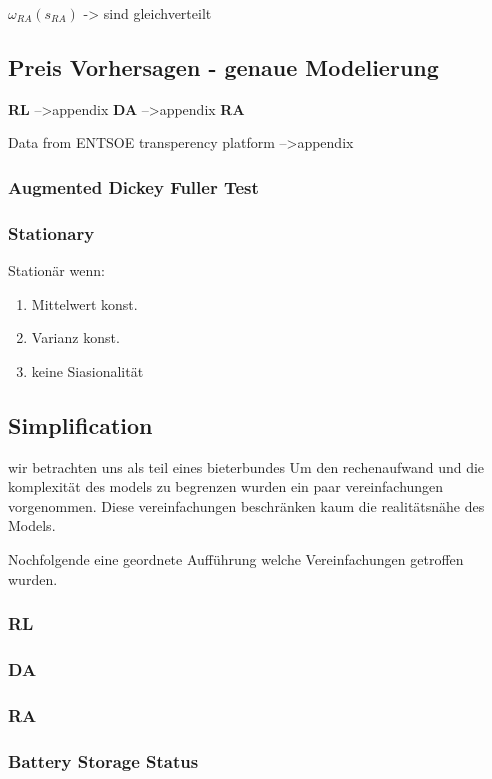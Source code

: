 $\omega_{RA}(s_{RA})$ -> sind gleichverteilt
\subsection{Preis Vorhersagen - genaue Modelierung}
\textbf{RL}
-->appendix
\textbf{DA}
-->appendix
\textbf{RA}


Data from ENTSOE transperency platform
-->appendix


\subsubsection{Augmented Dickey Fuller Test}
\subsubsection{Stationary}
Stationär wenn:
\begin{enumerate}
	\item Mittelwert konst.
	\item Varianz konst.
	\item keine Siasionalität
\end{enumerate}


\subsection{Simplification}

wir betrachten uns als teil eines bieterbundes
Um den rechenaufwand und die komplexität des models zu begrenzen wurden ein paar vereinfachungen vorgenommen.
Diese vereinfachungen beschränken kaum die realitätsnähe des Models.

Nochfolgende eine geordnete Aufführung welche Vereinfachungen getroffen wurden.
\subsubsection{RL}

\subsubsection{DA}
\subsubsection{RA}
\subsubsection{Battery Storage Status}

